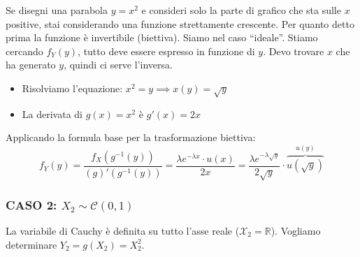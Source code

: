Se disegni una parabola $y = x^2$ e consideri solo la parte di grafico che sta sulle $x$ positive, stai considerando una funzione strettamente crescente. Per quanto detto prima la funzione è invertibile (biettiva).
Siamo nel caso ``ideale''. Stiamo cercando $f_Y(y)$, tutto deve essere espresso in funzione di $y$.
Devo trovare $x$ che ha generato $y$, quindi ci serve l'inversa.

\begin{itemize}
    \item Risolviamo l'equazione: $x^2 = y \implies x(y) = \sqrt{y}$
    \item La derivata di $g(x) = x^2$ è $g'(x) = 2x$
\end{itemize}

Applicando la formula base per la trasformazione biettiva:
\begin{equation}
f_Y(y) = \frac{f_X(g^{-1}(y))}{(g)'(g^{-1}(y))} = \frac{\lambda e^{-\lambda x} \cdot u(x)}{2x} = \frac{\lambda e^{-\lambda \sqrt{y}}}{2\sqrt{y}} \cdot \overbrace{u(\sqrt{y})}^{u(y)}
\end{equation}


\subsubsection*{CASO 2: $X_2 \sim \mathcal{C}(0,1)$}

La variabile di Cauchy è definita su tutto l'asse reale ($\mathcal{X}_2 = \mathbb{R}$). 
Vogliamo determinare $Y_2 = g(X_2) = X_2^2$.

\begin{center}
\end{center}

